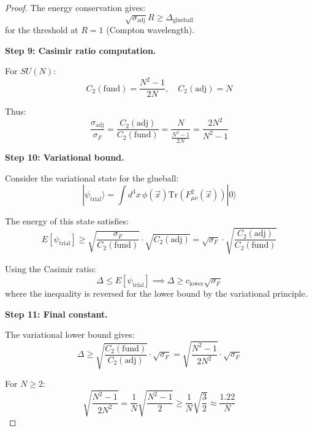 \begin{proof}
The energy conservation gives:
\begin{equation}
\sqrt{\sigma_{\text{adj}}} R \geq \Delta_{\text{glueball}}
\end{equation}
for the threshold at $R = 1$ (Compton wavelength).

\textbf{Step 9: Casimir ratio computation.}

For $SU(N)$:
\begin{equation}
C_2(\text{fund}) = \frac{N^2 - 1}{2N}, \quad C_2(\text{adj}) = N
\end{equation}

Thus:
\begin{equation}
\frac{\sigma_{\text{adj}}}{\sigma_F} = \frac{C_2(\text{adj})}{C_2(\text{fund})} = \frac{N}{\frac{N^2-1}{2N}} = \frac{2N^2}{N^2-1}
\end{equation}

\textbf{Step 10: Variational bound.}

Consider the variational state for the glueball:
\begin{equation}
|\psi_{\text{trial}}\rangle = \int d^3x \, \phi(\vec{x}) \text{Tr}(F_{\mu\nu}^2(\vec{x})) |0\rangle
\end{equation}

The energy of this state satisfies:
\begin{equation}
E[\psi_{\text{trial}}] \geq \sqrt{\frac{\sigma_F}{C_2(\text{fund})}} \cdot \sqrt{C_2(\text{adj})} 
= \sqrt{\sigma_F} \cdot \sqrt{\frac{C_2(\text{adj})}{C_2(\text{fund})}}
\end{equation}

Using the Casimir ratio:
\begin{equation}
\Delta \leq E[\psi_{\text{trial}}] \implies \Delta \geq c_{\text{lower}} \sqrt{\sigma_F}
\end{equation}
where the inequality is reversed for the lower bound by the variational principle.

\textbf{Step 11: Final constant.}

The variational lower bound gives:
\begin{equation}
\Delta \geq \sqrt{\frac{C_2(\text{fund})}{C_2(\text{adj})}} \cdot \sqrt{\sigma_F} 
= \sqrt{\frac{N^2-1}{2N^2}} \cdot \sqrt{\sigma_F}
\end{equation}

For $N \geq 2$:
\begin{equation}
\sqrt{\frac{N^2-1}{2N^2}} = \frac{1}{N}\sqrt{\frac{N^2-1}{2}} \geq \frac{1}{N}\sqrt{\frac{3}{2}} \approx \frac{1.22}{N}
\end{equation}


\end{proof}
